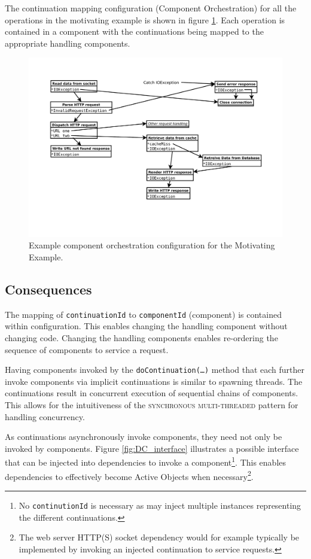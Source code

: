\documentclass[prodmode]{style/acmlarge}
\begin{document}
The continuation mapping configuration (Component Orchestration) for all the
operations in the motivating example is shown in figure
\ref{fig:ExampleComponentOrchestration}.  Each operation is contained in a
component with the continuations being mapped to the appropriate handling
components.
 
\begin{figure}[!t]
\centering
\includegraphics[width=4.5in]{ContinuationInjectionComponentOrchestration}
\caption{Example component orchestration configuration for the Motivating Example.}
\label{fig:ExampleComponentOrchestration}
\end{figure}


\subsection{Consequences}

The mapping of \texttt{continuationId} to \texttt{componentId} (component) is
contained within configuration.  This enables changing the handling component
without changing code.  Changing the handling components enables re-ordering the
sequence of components to service a request.

Having components invoked by the \texttt{doContinuation(\ldots)} method that
each further invoke components via implicit continuations is similar to spawning
threads.  The continuations result in concurrent execution of sequential chains
of components.  This allows for the intuitiveness of the \textsc{synchronous
multi-threaded} pattern \cite{proactor} for handling concurrency.

As continuations asynchronously invoke components, they need not only be invoked
by components. Figure \ref{fig:DC_interface} illustrates a possible interface
that can be injected into dependencies to invoke a component\footnote{No
\texttt{continutionId} is necessary as may inject multiple instances
representing the different continuations.}.  This enables dependencies to
effectively become Active Objects \cite{active-object} when
necessary\footnote{The web server HTTP(S) socket dependency would for example
typically be implemented by invoking an injected continuation to service
requests.}.
\end{document}
